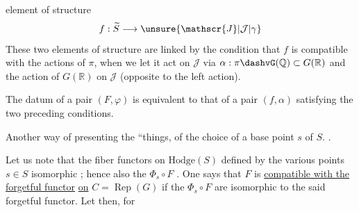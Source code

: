  element of structure
\[
f:\widetilde{S}\longrightarrow\unsure{\mathscr{J}|\mathcal{J}|\gamma}
\]
These two elements of structure are linked by the condition that $f$ is compatible with the actions of $\pi$, when we let it act on $\mathscr{J}$ via $\alpha:\pi\dashvG(\mathbb{Q})\subset G(\mathbb{R})$ and the  action of $G(\mathbb{R})$ on $\mathscr{J}$ (opposite to the left action).

The datum of a pair $(F,\varphi)$ is equivalent to that of a pair $(f,\alpha)$ satisfying the two preceding conditions.


Another way of presenting the ``things,  of the choice of a base point $s$ of $S$. .

 Let us note that the fiber functors  on  $\mathrm{Hodge}(S)$ defined by the various points $s\in S$   isomorphic ; hence also the $\Phi_s\circ F$ . One says that  $F$ is \uline{compatible with the} \uline{forgetful functor} \uline{on} $C=\operatorname{Rep}(G)$ if the $\Phi_s\circ F$ are isomorphic to the said forgetful functor. Let then, for

